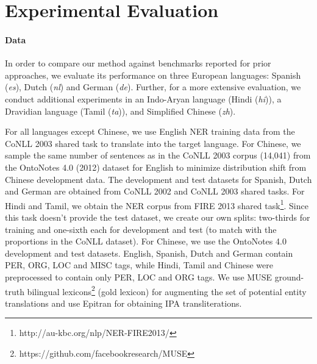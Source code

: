 \documentclass[11pt,a4paper]{article}
\begin{document}
\section{Experimental Evaluation}
\paragraph{Data}
In order to compare our method against benchmarks reported for prior approaches, 
we evaluate its performance on three European languages: 
Spanish (\textit{es}), Dutch (\textit{nl}) and German (\textit{de}). 
Further, for a more extensive evaluation, 
we conduct additional experiments in
an Indo-Aryan language (Hindi (\textit{hi})),
a Dravidian language (Tamil (\textit{ta})), 
and Simplified Chinese (\textit{zh}).


For all languages except Chinese, 
we use English NER training data 
from the CoNLL 2003 shared task \cite{sang2003introduction} 
to translate into the target language. 
For Chinese, we sample the same number of sentences as
in the CoNLL 2003 corpus (14,041) from the OntoNotes 4.0 (2012) 
dataset for English \cite{weischedel2011ontonotes} to minimize distribution shift from Chinese development data. 
The development and test datasets for Spanish, Dutch and German 
are obtained from CoNLL 2002 \cite{sang2002introduction} 
and CoNLL 2003 shared tasks. 
For Hindi and Tamil, we obtain the NER corpus from FIRE 2013 shared task\footnote{http://au-kbc.org/nlp/NER-FIRE2013/}. 
Since this task doesn't provide the test dataset, 
we create our own splits: two-thirds for training 
and one-sixth each for development 
and test (to match with the proportions in the CoNLL dataset). 
For Chinese, we use the OntoNotes 4.0 development and test datasets. 
English, Spanish, Dutch and German contain PER, ORG, LOC and MISC tags, 
while Hindi, Tamil and Chinese were preprocessed 
to contain only PER, LOC and ORG tags.
We use MUSE ground-truth bilingual lexicons\footnote{https://github.com/facebookresearch/MUSE} (gold lexicon) for augmenting the set of potential entity translations and use Epitran \cite{mortensen2018epitran} for obtaining IPA transliterations.
\end{document}

